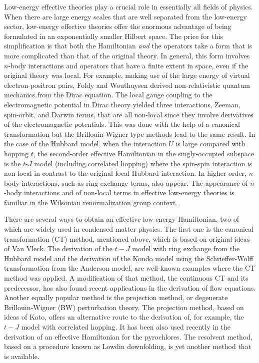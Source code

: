 \documentclass[floatfix,twocolumn,aps,prb,showpacs,superscriptaddress]{revtex4}
\begin{document}
Low-energy effective theories play a crucial role in essentially all fields
of physics. When there are large energy scales that are well separated from
the low-energy sector, low-energy effective theories offer the enormous
advantage of being formulated in an exponentially smaller Hilbert space. The
price for this simplification is that both the Hamiltonian \textit{and} the
operators take a form that is more complicated than that of the original
theory. In general, this form involves $n$-body interactions and operators
that have a finite extent in space, even if the original theory was local.
For example, making use of the large energy of virtual electron-positron
pairs, Foldy and Wouthuysen derived non-relativistic quantum mechanics from
the Dirac equation.\cite{Foldy:1950} The local gauge coupling to the
electromagnetic potential in Dirac theory yielded three interactions,
Zeeman, spin-orbit, and Darwin terms, that are all non-local since they
involve derivatives of the electromagnetic potentials. This was done with
the help of a canonical transformation\cite{Foldy:1950} but the
Brillouin-Wigner type methods lead to the same result.\cite{Sakurai:1967} In
the case of the Hubbard model, when the interaction $U$ is large compared
with hopping $t$, the second-order effective Hamiltonian in the
singly-occupied subspace is the $t$-$J$ model (including correlated hopping)
where the spin-spin interaction is non-local in contrast to the original
local Hubbard interaction. In higher order, $n$-body interactions, such as
ring-exchange terms, also appear.\cite{Girvin:1989} The appearance of $n$%
-body interactions and of non-local terms in effective low-energy theories
is familiar in the Wilsonian renormalization group context.\cite{Wilson:1975}


There are several ways to obtain an effective low-energy Hamiltonian, \cite%
{Klein:1974} two of which are widely used in condensed matter physics. The
first one is the canonical transformation (CT) method, mentioned above, \cite%
{Foldy:1950} which is based on original ideas of Van Vleck. \cite%
{VanVleck:1929} The derivation of the $t-J$ model with ring exchange\cite%
{Takahashi:1977,Girvin:1989} from the Hubbard model and the derivation of
the Kondo model using the Schrieffer-Wolff transformation\cite%
{SchriefferWolf} from the Anderson model, are well-known examples where the
CT method was applied. A modification of that method, the continuous CT \cite%
{Wegner:1994,Uhrig:2000} and its predecessor, \cite{Safonov} has also found
recent applications in the derivation of flow equations. Another equally
popular method is the projection method, or degenerate Brillouin-Wigner (BW)
perturbation theory. The projection method, based on ideas of Kato, \cite%
{Kato:1949} offers an alternative route to the derivation of, for example,
the $t-J$ model with correlated hopping.\cite{Anderson:1959,Fazekas}
It has been also used recently 
in the derivation of an effective Hamiltonian for the pyrochlores.\cite%
{Hemerle:2003} The resolvent method, based on a procedure known as Lowdin
downfolding,\cite{Lowdin} is yet another method that is available.
\end{document}
